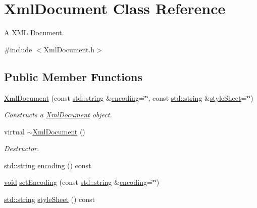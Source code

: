 \hypertarget{class_xml_document}{\section{Xml\-Document Class Reference}
\label{class_xml_document}
}


A X\-M\-L Document.  




{\ttfamily \#include $<$Xml\-Document.\-h$>$}

\subsection*{Public Member Functions}
\begin{DoxyCompactItemize}
\item 
\hyperlink{class_xml_document_a3bc4c5ea5f22b4ff8776422125b31d42}{Xml\-Document} (const \hyperlink{glew_8h_ae84541b4f3d8e1ea24ec0f466a8c568b}{std\-::string} \&\hyperlink{class_xml_document_a5063b9dc310ed5ed7a38b77f8584a50c}{encoding}=\char`\"{}\char`\"{}, const \hyperlink{glew_8h_ae84541b4f3d8e1ea24ec0f466a8c568b}{std\-::string} \&\hyperlink{class_xml_document_ae0a7e5e1f28b179c31bee66481b18c03}{style\-Sheet}=\char`\"{}\char`\"{})
\begin{DoxyCompactList}\small\item\em Constructs a \hyperlink{class_xml_document}{Xml\-Document} object. \end{DoxyCompactList}\item 
virtual \hyperlink{class_xml_document_a5c95c959091f1ae826b8698ba0c3416c}{$\sim$\-Xml\-Document} ()
\begin{DoxyCompactList}\small\item\em Destructor. \end{DoxyCompactList}\item 
\hyperlink{glew_8h_ae84541b4f3d8e1ea24ec0f466a8c568b}{std\-::string} \hyperlink{class_xml_document_a5063b9dc310ed5ed7a38b77f8584a50c}{encoding} () const 
\item 
\hyperlink{wglew_8h_aeea6e3dfae3acf232096f57d2d57f084}{void} \hyperlink{class_xml_document_afb4401e77f67626533ba7409a011c508}{set\-Encoding} (const \hyperlink{glew_8h_ae84541b4f3d8e1ea24ec0f466a8c568b}{std\-::string} \&\hyperlink{class_xml_document_a5063b9dc310ed5ed7a38b77f8584a50c}{encoding}=\char`\"{}\char`\"{})
\item 
\hyperlink{glew_8h_ae84541b4f3d8e1ea24ec0f466a8c568b}{std\-::string} \hyperlink{class_xml_document_ae0a7e5e1f28b179c31bee66481b18c03}{style\-Sheet} () const 

\end{DoxyCompactItemize}
